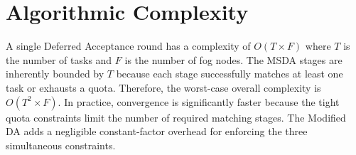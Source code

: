 \section{Algorithmic Complexity}
A single Deferred Acceptance round has a complexity of $O(T \times F)$ where $T$ is the number of tasks and $F$ is the number of fog nodes. The MSDA stages are inherently bounded by $T$ because each stage successfully matches at least one task or exhausts a quota. Therefore, the worst-case overall complexity is $O(T^2 \times F)$. In practice, convergence is significantly faster because the tight quota constraints limit the number of required matching stages. The Modified DA adds a negligible constant-factor overhead for enforcing the three simultaneous constraints.

